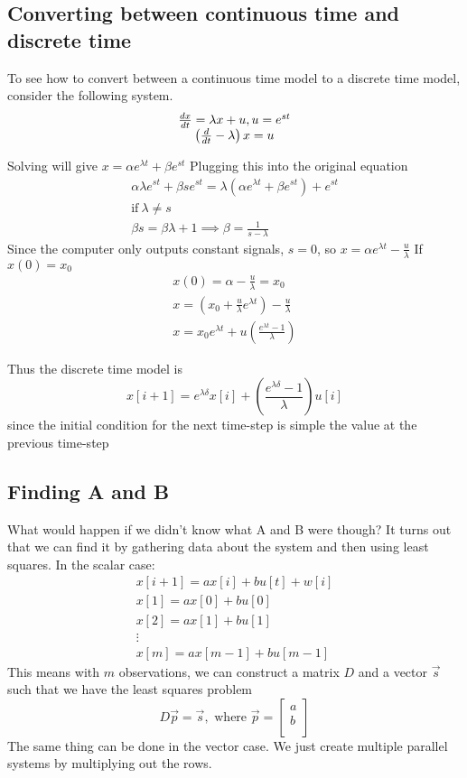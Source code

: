 \documentclass{article}
\begin{document}
\subsection{Converting between continuous time and discrete time}
To see how to convert between a continuous time model to a discrete time model, consider the following system.
\[
    \begin{array}{c}
        \frac{dx}{dt}=\lambda x+u, u=e^{st}\\
        \left(
            \frac{d}{dt}-\lambda
            \right)x = u
    \end{array}\\
\]

Solving will give $x=\alpha e^{\lambda t}+\beta e^{st}$
Plugging this into the original equation
\[
    \begin{array}{c}
        \alpha \lambda e^{st}+\beta se^{st} = \lambda (\alpha e^{\lambda t}+\beta e^{st})+e^{st}\\
        \text{if}\> \lambda \ne s\\
        \beta s = \beta \lambda + 1 \implies \beta = \frac{1}{s-\lambda}
    \end{array}
    \]
Since the computer only outputs constant signals, $s=0$, so $x=\alpha e^{\lambda t}-\frac{u}{\lambda}$
If $x(0)=x_0$
\[
    \begin{array}{c}
        x(0)=\alpha - \frac{u}{\lambda}=x_0\\
        x = (x_0+\frac{u}{\lambda}e^{\lambda t})-\frac{u}{\lambda}\\
        x = x_0 e^{\lambda t}+u\left(
            \frac{e^{\lambda t}-1}{\lambda}
        \right)
    \end{array}
\]

Thus the discrete time model is
$$x[i+1]=e^{\lambda \delta}x[i]+\left(
    \frac{e^{\lambda \delta}-1}{\lambda}\right) u[i]$$
since the initial condition for the next time-step is simple the value at the previous time-step

\subsection{Finding A and B}
What would happen if we didn't know what A and B were though? It turns out that we can find it by gathering data about the system and then using least squares.
In the scalar case:
\[
    \begin{array}{c}
        x[i+1]=ax[i]+bu[t]+w[i]\\
        x[1]=ax[0]+bu[0]\\
        x[2]=ax[1]+bu[1]\\
        \vdots\\
        x[m]=ax[m-1]+bu[m-1]
    \end{array}
\]
This means with $m$ observations, we can construct a matrix $D$ and a vector $\vec{s}$ such that we have the least squares problem
\[
    D\vec{p}=\vec{s},\text{ where } \vec{p}=
\left[
    \begin{array}{c}
        a\\
        b\\
    \end{array}
\right]
\]
The same thing can be done in the vector case. We just create multiple parallel systems by multiplying out the rows.
\end{document}
